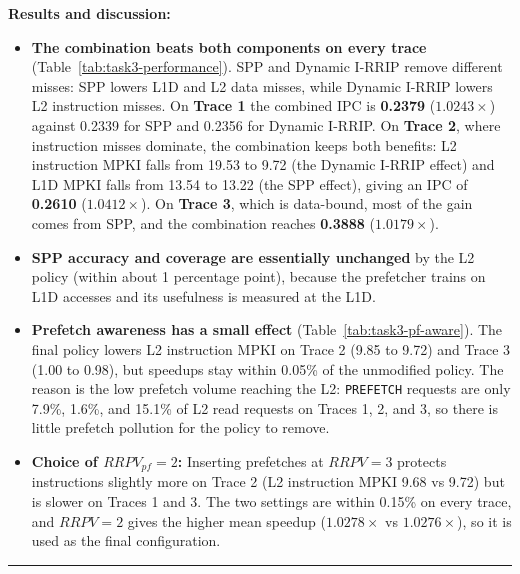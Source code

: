 \documentclass[a4paper, 11pt]{article}
\begin{document}
\textbf{Results and discussion:}
\begin{itemize}
    \item \textbf{The combination beats both components on every trace} (Table~\ref{tab:task3-performance}). SPP and Dynamic I-RRIP remove different misses: SPP lowers L1D and L2 data misses, while Dynamic I-RRIP lowers L2 instruction misses. On \textbf{Trace 1} the combined IPC is \textbf{0.2379} ($1.0243\times$) against 0.2339 for SPP and 0.2356 for Dynamic I-RRIP. On \textbf{Trace 2}, where instruction misses dominate, the combination keeps both benefits: L2 instruction MPKI falls from 19.53 to 9.72 (the Dynamic I-RRIP effect) and L1D MPKI falls from 13.54 to 13.22 (the SPP effect), giving an IPC of \textbf{0.2610} ($1.0412\times$). On \textbf{Trace 3}, which is data-bound, most of the gain comes from SPP, and the combination reaches \textbf{0.3888} ($1.0179\times$).
    \item \textbf{SPP accuracy and coverage are essentially unchanged} by the L2 policy (within about 1 percentage point), because the prefetcher trains on L1D accesses and its usefulness is measured at the L1D.
    \item \textbf{Prefetch awareness has a small effect} (Table~\ref{tab:task3-pf-aware}). The final policy lowers L2 instruction MPKI on Trace 2 (9.85 to 9.72) and Trace 3 (1.00 to 0.98), but speedups stay within 0.05\% of the unmodified policy. The reason is the low prefetch volume reaching the L2: \texttt{PREFETCH} requests are only 7.9\%, 1.6\%, and 15.1\% of L2 read requests on Traces 1, 2, and 3, so there is little prefetch pollution for the policy to remove.
    \item \textbf{Choice of $RRPV_{pf} = 2$:} Inserting prefetches at $RRPV = 3$ protects instructions slightly more on Trace 2 (L2 instruction MPKI 9.68 vs 9.72) but is slower on Traces 1 and 3. The two settings are within 0.15\% on every trace, and $RRPV = 2$ gives the higher mean speedup ($1.0278\times$ vs $1.0276\times$), so it is used as the final configuration.
\end{itemize}

 
\noindent\rule{\linewidth}{0.4pt}
\end{document}
